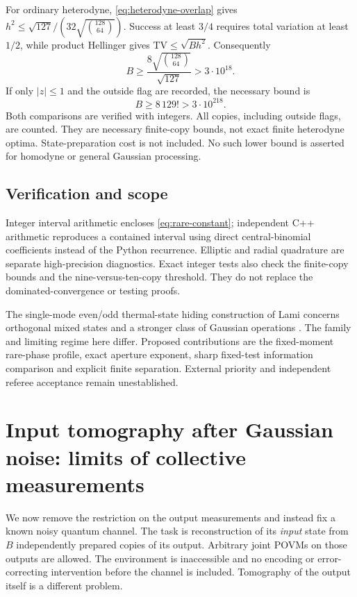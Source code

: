 \documentclass[11pt,a4paper]{article}
\numberwithin{equation}{section}
\begin{document}
For ordinary heterodyne, \eqref{eq:heterodyne-overlap} gives
$h^2\le\sqrt{127}/(32\sqrt{\binom{128}{64}})$.
Success at least $3/4$ requires total variation at least $1/2$, while
product Hellinger gives $\mathrm{TV}\le\sqrt{Bh^2}$. Consequently
\[
 \boxed{ B\ge\frac{8\sqrt{\binom{128}{64}}}{\sqrt{127}}
                         >3\cdot10^{18}. }
 \tag{C.21}\label{eq:rare-heterodyne-copies}
\]
If only $|z|\le1$ and the outside flag are recorded, the necessary bound is
\[
 \boxed{ B\ge8\,129!>3\cdot10^{218}. }
 \tag{C.22}\label{eq:rare-unit-copies}
\]
Both comparisons are verified with integers. All copies, including outside
flags, are counted. They are necessary finite-copy bounds, not exact finite
heterodyne optima. State-preparation cost is not included. No such lower
bound is asserted for homodyne or general Gaussian processing.

\subsection{Verification and scope}
Integer interval arithmetic encloses \eqref{eq:rare-constant}; independent
C++ arithmetic reproduces a contained interval using direct central-binomial
coefficients instead of the Python recurrence. Elliptic and radial
quadrature are separate high-precision diagnostics. Exact integer tests
also check the finite-copy bounds and the nine-versus-ten-copy threshold.
They do not replace the dominated-convergence or testing proofs.

The single-mode even/odd thermal-state hiding construction of Lami concerns
orthogonal mixed states and a stronger class of Gaussian operations
\cite{Lami2021}. The family and limiting regime here differ. Proposed
contributions are the fixed-moment rare-phase profile, exact aperture
exponent, sharp fixed-test information comparison and explicit finite
separation. External priority and independent referee acceptance remain
unestablished.

\section{Input tomography after Gaussian noise: limits of collective measurements}
\label{sec:gaussian-inverse}
We now remove the restriction on the output measurements and instead fix a
known noisy quantum channel. The task is reconstruction of its \emph{input}
state from $B$ independently prepared copies of its output. Arbitrary joint
POVMs on those outputs are allowed. The environment is inaccessible and no
encoding or error-correcting intervention before the channel is included.
Tomography of the output itself is a different problem.
\end{document}
